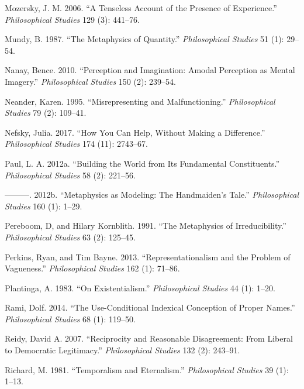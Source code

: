 \documentclass[
  10pt,
  letterpaper,
  DIV=11,
  numbers=noendperiod,
  twoside]{scrartcl}
\newlength{\cslhangindent}
\newenvironment{CSLReferences}[2] %
 {\begin{list}{}{%
  \setlength{\itemindent}{0pt}
  \setlength{\leftmargin}{0pt}
  \setlength{\parsep}{0pt}
  \ifodd #1
   \setlength{\leftmargin}{\cslhangindent}
   \setlength{\itemindent}{-1\cslhangindent}
  \fi
  \setlength{\itemsep}{#2\baselineskip}}}
 {\end{list}}
\begin{document}
\begin{CSLReferences}{1}{0}
Mozersky, J. M. 2006. {``A Tenseless Account of the Presence of
Experience.''} \emph{Philosophical Studies} 129 (3): 441--76.

Mundy, B. 1987. {``The Metaphysics of Quantity.''} \emph{Philosophical
Studies} 51 (1): 29--54.

Nanay, Bence. 2010. {``Perception and Imagination: Amodal Perception as
Mental Imagery.''} \emph{Philosophical Studies} 150 (2): 239--54.

Neander, Karen. 1995. {``Misrepresenting and Malfunctioning.''}
\emph{Philosophical Studies} 79 (2): 109--41.

Nefsky, Julia. 2017. {``How You Can Help, Without Making a
Difference.''} \emph{Philosophical Studies} 174 (11): 2743--67.

Paul, L. A. 2012a. {``Building the World from Its Fundamental
Constituents.''} \emph{Philosophical Studies} 58 (2): 221--56.

---------. 2012b. {``Metaphysics as Modeling: The Handmaiden's Tale.''}
\emph{Philosophical Studies} 160 (1): 1--29.

Pereboom, D, and Hilary Kornblith. 1991. {``The Metaphysics of
Irreducibility.''} \emph{Philosophical Studies} 63 (2): 125--45.

Perkins, Ryan, and Tim Bayne. 2013. {``Representationalism and the
Problem of Vagueness.''} \emph{Philosophical Studies} 162 (1): 71--86.

Plantinga, A. 1983. {``On Existentialism.''} \emph{Philosophical
Studies} 44 (1): 1--20.

Rami, Dolf. 2014. {``The Use-Conditional Indexical Conception of Proper
Names.''} \emph{Philosophical Studies} 68 (1): 119--50.

Reidy, David A. 2007. {``Reciprocity and Reasonable Disagreement: From
Liberal to Democratic Legitimacy.''} \emph{Philosophical Studies} 132
(2): 243--91.

Richard, M. 1981. {``Temporalism and Eternalism.''} \emph{Philosophical
Studies} 39 (1): 1--13.


\end{CSLReferences}
\end{document}
